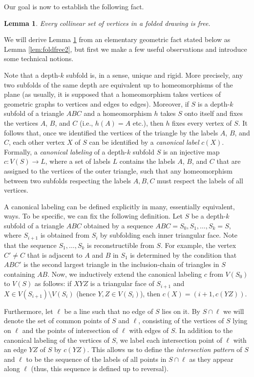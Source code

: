 \documentclass[reqno,12pt]{amsart}
\newcommand{\function}[2]{:#1 \rightarrow #2}
\newtheorem{lemma}[theorem]{Lemma}
\begin{document}
Our goal is now to establish the following fact.

\begin{lemma}\label{lem:foldfree}
Every collinear set of vertices in a folded drawing is free.
\end{lemma}

We will derive Lemma \ref{lem:foldfree} from an elementary geometric fact
stated below as Lemma \ref{lem:foldfree2},
but first we make a few useful observations and introduce some technical notions.

Note that a depth-$k$ subfold is, in a sense, unique and rigid.
More precisely, any two subfolds of the same depth are equivalent up to homeomorphisms
of the plane
(as usually, it is supposed that a homeomorphism takes vertices of geometric graphs
to vertices and edges to edges). Moreover, if $S$ is a depth-$k$ subfold of a triangle $ABC$
and a homeomorphism $h$ takes $S$ onto itself and fixes the vertices $A$, $B$, and $C$
(i.e., $h(A)=A$ etc.), then $h$ fixes every vertex of $S$.
It follows that, once we identified the vertices of the triangle by the labels
$A$, $B$, and $C$, each other vertex $X$ of $S$ can be identified by a \emph{canonical label} $c(X)$. 
Formally, a \emph{canonical labeling} of a depth-$k$ subfold $S$ is an injective map $c\function{V(S)}L$,
where a set of labels $L$ contains the labels $A$, $B$, and $C$ that are assigned to the vertices
of the outer triangle, such that any homeomorphism between two subfolds respecting the labels $A,B,C$
must respect the labels of all vertices.



A canonical labeling can be defined explicitly in many, essentially equivalent, ways.
To be specific, we can fix the following definition.
Let $S$ be a depth-$k$ subfold of a triangle $ABC$ obtained by a sequence
$ABC=S_0,S_1,\ldots,S_k=S$, where $S_{i+1}$ is obtained from $S_i$ by subfolding
each inner triangular face. Note that the sequence $S_1,\ldots,S_k$ is reconstructible
from $S$. For example, the vertex $C'\ne C$ that is adjacent to $A$ and $B$ in $S_1$
is determined by the condition that $ABC'$ is the second largest triangle in
the inclusion-chain of triangles in $S$ containing $AB$.
Now, we inductively extend the canonical labeling $c$ from $V(S_0)$ to $V(S)$
as follows:
if $XYZ$ is a triangular face of $S_{i+1}$ and $X\in V(S_{i+1})\setminus V(S_{i})$
(hence $Y,Z\in V(S_{i})$), then $c(X)=(i+1,c(YZ))$.

Furthermore, let $\ell$ be a line such that no edge of $S$ lies on it.
By $S\cap\ell$ we will denote the set of common points of $S$ and $\ell$,
consisting of the vertices of $S$ lying on $\ell$ and the points of intersection
of $\ell$ with edges of $S$. In addition to the canonical labeling of the vertices
of $S$, we label each intersection point of $\ell$ with an edge $YZ$ of $S$
by $c(YZ)$. This allows us to define the \emph{intersection pattern}
of $S$ and $\ell$ to be the sequence of the labels of all points in $S\cap\ell$
as they appear along $\ell$ (thus, this sequence is defined up to reversal).
\end{document}
